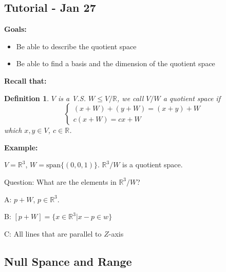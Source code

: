 \documentclass[12pt]{article}
\theoremstyle{plain}
\newtheorem{definition}{Definition}[subsection]
\newcommand{\Span}{\mathrm{span}}
\newcommand{\mR}{{\mathbb{R}}}
\begin{document}


	\newpage
	\subsection{Tutorial - Jan 27}
	
	\textbf{Goals: }
	\begin{itemize}
		\item Be able to describe the quotient space
		\item Be able to find a basis and the dimension of the quotient space
	\end{itemize}

	\textbf{Recall that: }
	
	\begin{definition}
		$V$ is a V.S. $W\leq V / \mR$, we call $V/W$ a quotient space if 
		\[
			\begin{cases}
				(x+W)+(y+W) = (x+y)+W\\
				c(x+W) = cx+W 
			\end{cases}
		\]
		which $x, y \in V$, $c \in \mR$.
	\end{definition}

	{\color{Brown}
		\textbf{Example: }
		
		$V = \mR^3$, $W = \Span\{(0,0,1)\}$. $\mR^3 / W$ is a quotient space.

		Question: What are the elements in $\mR^3/W$?
		
		A: $p+W$, $p \in \mR^3$.

		B: $[p+W]= \{x\in \mR^3 | x-p \in w\}$
		
		C: All lines that are parallel to $Z$-axis
	}
	


	\newpage
	\subsection{Null Spance and Range}
\end{document}
